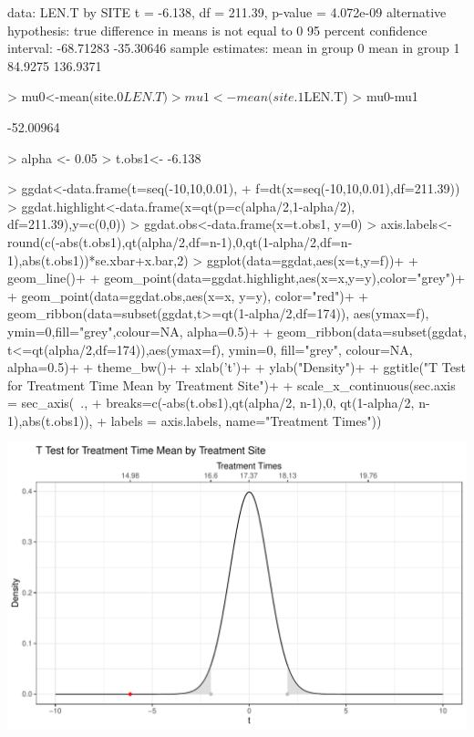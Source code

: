 \documentclass{article}
\begin{document}
\begin{enumerate}
\begin{enumerate}
\begin{Schunk}
\begin{Soutput}
data:  LEN.T by SITE
t = -6.138, df = 211.39, p-value = 4.072e-09
alternative hypothesis: true difference in means is not equal to 0
95 percent confidence interval:
 -68.71283 -35.30646
sample estimates:
mean in group 0 mean in group 1 
        84.9275        136.9371 
\end{Soutput}
\begin{Sinput}
> mu0<-mean(site.0$LEN.T)
> mu1<-mean(site.1$LEN.T)
> mu0-mu1
\end{Sinput}
\begin{Soutput}
[1] -52.00964
\end{Soutput}
\begin{Sinput}
> alpha <- 0.05
> t.obs1<- -6.138
\end{Sinput}
\end{Schunk}

\begin{Schunk}
\begin{Sinput}
> ggdat<-data.frame(t=seq(-10,10,0.01),
+                   f=dt(x=seq(-10,10,0.01),df=211.39))
> ggdat.highlight<-data.frame(x=qt(p=c(alpha/2,1-alpha/2), df=211.39),y=c(0,0))
> ggdat.obs<-data.frame(x=t.obs1, y=0)
> axis.labels<-round(c(-abs(t.obs1),qt(alpha/2,df=n-1),0,qt(1-alpha/2,df=n-1),abs(t.obs1))*se.xbar+x.bar,2)
> ggplot(data=ggdat,aes(x=t,y=f))+
+   geom_line()+
+   geom_point(data=ggdat.highlight,aes(x=x,y=y),color="grey")+
+   geom_point(data=ggdat.obs,aes(x=x, y=y), color="red")+
+   geom_ribbon(data=subset(ggdat,t>=qt(1-alpha/2,df=174)), aes(ymax=f), ymin=0,fill="grey",colour=NA, alpha=0.5)+
+   geom_ribbon(data=subset(ggdat, t<=qt(alpha/2,df=174)),aes(ymax=f), ymin=0, fill="grey", colour=NA, alpha=0.5)+
+     theme_bw()+
+   xlab('t')+
+   ylab("Density")+
+   ggtitle("T Test for Treatment Time Mean by Treatment Site")+
+   scale_x_continuous(sec.axis = sec_axis(~.,
+                                          breaks=c(-abs(t.obs1),qt(alpha/2, n-1),0, qt(1-alpha/2, n-1),abs(t.obs1)),
+                                          labels = axis.labels, name="Treatment Times"))
\end{Sinput}
\end{Schunk}
\includegraphics{HW2-045}

\end{enumerate}
\end{enumerate}
\end{document}
